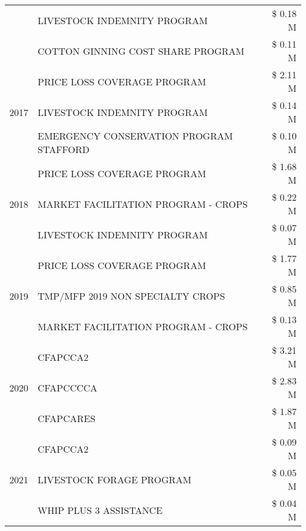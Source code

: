 \begin{tabular}{llr}
 & LIVESTOCK INDEMNITY PROGRAM & \$ 0.18 M \\
 & COTTON GINNING COST SHARE PROGRAM & \$ 0.11 M \\
\cline{1-3}
\multirow[t]{3}{*}{2017} & PRICE LOSS COVERAGE PROGRAM & \$ 2.11 M \\
 & LIVESTOCK INDEMNITY PROGRAM & \$ 0.14 M \\
 & EMERGENCY CONSERVATION PROGRAM STAFFORD & \$ 0.10 M \\
\cline{1-3}
\multirow[t]{3}{*}{2018} & PRICE LOSS COVERAGE PROGRAM & \$ 1.68 M \\
 & MARKET FACILITATION PROGRAM - CROPS & \$ 0.22 M \\
 & LIVESTOCK INDEMNITY PROGRAM & \$ 0.07 M \\
\cline{1-3}
\multirow[t]{3}{*}{2019} & PRICE LOSS COVERAGE PROGRAM & \$ 1.77 M \\
 & TMP/MFP 2019 NON SPECIALTY CROPS & \$ 0.85 M \\
 & MARKET FACILITATION PROGRAM - CROPS & \$ 0.13 M \\
\cline{1-3}
\multirow[t]{3}{*}{2020} & CFAPCCA2 & \$ 3.21 M \\
 & CFAPCCCCA & \$ 2.83 M \\
 & CFAPCARES & \$ 1.87 M \\
\cline{1-3}
\multirow[t]{3}{*}{2021} & CFAPCCA2 & \$ 0.09 M \\
 & LIVESTOCK FORAGE PROGRAM & \$ 0.05 M \\
 & WHIP PLUS 3 ASSISTANCE & \$ 0.04 M \\
\cline{1-3}
\bottomrule
\end{tabular}
